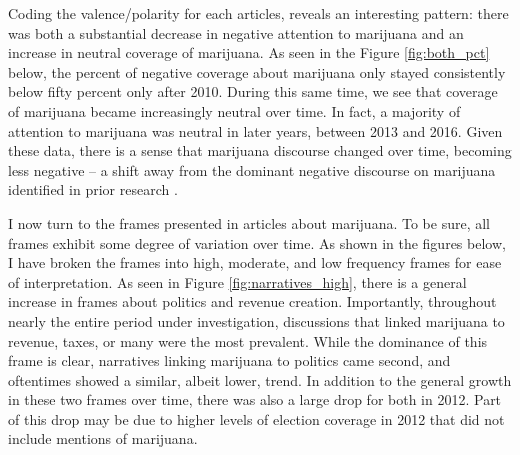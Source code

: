 Coding the valence/polarity for each articles, reveals an interesting pattern: there was both a substantial decrease in negative attention to marijuana and an increase in neutral coverage of marijuana. As seen in the Figure \ref{fig:both_pct} below, the percent of negative coverage about marijuana only stayed consistently below fifty percent only after 2010. %
During this same time, we see that coverage of marijuana became increasingly neutral over time. In fact, a majority of attention to marijuana was neutral in later years, between 2013 and 2016. Given these data, there is a sense that marijuana discourse changed over time, becoming less negative -- a shift away from the dominant negative discourse on marijuana identified in prior research \citep{mosher_and_akins_2019,bonnie_and_whitebread_1970}. 




%

%

I now turn to the frames presented in articles about marijuana. To be sure, all frames exhibit some degree of variation over time. As shown in the figures below, I have broken the frames into high, moderate, and low frequency frames for ease of interpretation. As seen in Figure \ref{fig:narratives_high}, there is a general increase in frames about politics and revenue creation.  Importantly, throughout nearly the entire period under investigation, discussions that linked marijuana to revenue, taxes, or many were the most prevalent. While the dominance of this frame is clear, narratives linking marijuana to politics came second, and oftentimes showed a similar, albeit lower, trend. In addition to the general growth in these two frames over time, there was also a large drop for both in 2012. Part of this drop may be due to higher levels of election coverage in 2012 that did not include mentions of marijuana. 


